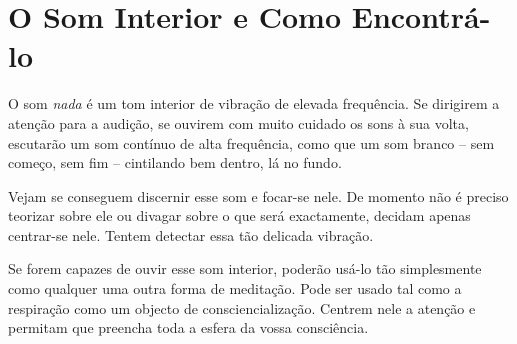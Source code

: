 \chapter{O Som Interior e Como Encontrá-lo}

O som \emph{nada} é um tom interior de vibração de elevada frequência.
Se dirigirem a atenção para a audição, se ouvirem com muito cuidado os
sons à sua volta, escutarão um som contínuo de alta frequência, como que
um som branco -- sem começo, sem fim -- cintilando bem dentro, lá no
fundo.

Vejam se conseguem discernir esse som e focar-se nele. De momento não é
preciso teorizar sobre ele ou divagar sobre o que será exactamente,
decidam apenas centrar-se nele. Tentem detectar essa tão delicada
vibração.

Se forem capazes de ouvir esse som interior, poderão usá-lo tão
simplesmente como qualquer uma outra forma de meditação. Pode ser usado
tal como a respiração como um objecto de consciencialização. Centrem
nele a atenção e permitam que preencha toda a esfera da vossa
consciência.
